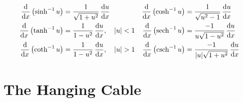 \documentclass[../main.tex]{subfiles}
\begin{document}
\begin{itemize}
    \begin{align*}
        \dv{x}\left( \sinh^{-1}u \right) &= \frac{1}{\sqrt{1+u^2}}\, \dv{u}{x}&
        \dv{x}\left( \cosh^{-1}u \right) &= \frac{1}{\sqrt{u^2-1}}\, \dv{u}{x}\\
        \dv{x}\left( \tanh^{-1}u \right) &= \frac{1}{1-u^2}\, \dv{u}{x},\quad|u|<1&
        \dv{x}\left( \sech^{-1}u \right) &= \frac{-1}{u\sqrt{1-u^2}}\, \dv{u}{x}\\
        \dv{x}\left( \coth^{-1}u \right) &= \frac{1}{1-u^2}\, \dv{u}{x},\quad|u|>1&
        \dv{x}\left( \csch^{-1}u \right) &= \frac{-1}{|u|\sqrt{1+u^2}}\, \dv{u}{x}
    \end{align*}
\end{itemize}



\section{The Hanging Cable}
\end{document}
